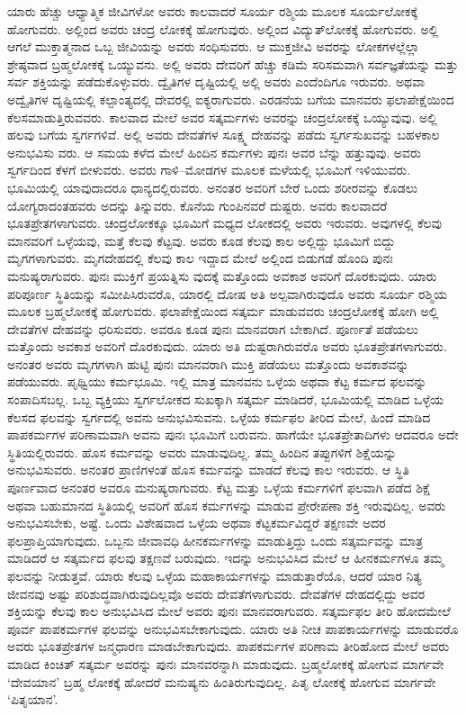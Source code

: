 ಯಾರು ಹೆಚ್ಚು ಆಧ್ಯಾತ್ಮಿಕ ಜೀವಿಗಳೋ ಅವರು ಕಾಲವಾದರೆ ಸೂರ್ಯ ರಶ್ಮಿಯ ಮೂಲಕ ಸೂರ್ಯಲೋಕಕ್ಕೆ ಹೋಗುವರು. ಅಲ್ಲಿಂದ ಅವರು ಚಂದ್ರ ಲೋಕಕ್ಕೆ ಹೋಗುವುರು. ಅಲ್ಲಿಂದ ವಿದ್ಯುತ್​ಲೋಕಕ್ಕೆ ಹೋಗುವರು. ಅಲ್ಲಿ ಆಗಲೆ ಮುಕ್ತಾತ್ಮನಾದ ಒಬ್ಬ ಜೀವಿಯನ್ನು ಅವರು ಸಂಧಿಸುವರು. ಆ ಮುಕ್ತಜೀವಿ ಅವರನ್ನು ಲೋಕಗಳಲ್ಲೆಲ್ಲಾ ಶ್ರೇಷ್ಠವಾದ ಬ್ರಹ್ಮಲೋಕಕ್ಕೆ ಒಯ್ಯುವನು. ಅಲ್ಲಿ ಅವರು ದೇವರಿಗೆ ಹೆಚ್ಚು ಕಡಿಮೆ ಸರಿಸಮವಾಗಿ ಸರ್ವಜ್ಞತೆಯನ್ನು ಮತ್ತು ಸರ್ವ ಶಕ್ತಿಯನ್ನು ಪಡೆದುಕೊಳ್ಳುವರು. ದ್ವೈತಿಗಳ ದೃಷ್ಟಿಯಲ್ಲಿ ಅಲ್ಲಿ ಅವರು ಎಂದೆಂದಿಗೂ ಇರುವರು. ಅಥವಾ ಅದ್ವೈತಿಗಳ ದೃಷ್ಟಿಯಲ್ಲಿ ಕಲ್ಪಾಂತ್ಯದಲ್ಲಿ ದೇವರಲ್ಲಿ ಐಕ್ಯರಾಗುವರು. ಎರಡನೆಯ ಬಗೆಯ ಮಾನವರು ಫಲಾಪೇಕ್ಷೆಯಿಂದ ಕೆಲಸಮಾಡುತ್ತಿರುವವರು. ಕಾಲವಾದ ಮೇಲೆ ಅವರ ಸತ್ಕರ್ಮಗಳು ಅವರನ್ನು ಚಂದ್ರಲೋಕಕ್ಕೆ ಒಯ್ಯುವುವು. ಅಲ್ಲಿ ಹಲವು ಬಗೆಯ ಸ್ವರ್ಗಗಳಿವೆ. ಅಲ್ಲಿ ಅವರು ದೇವತೆಗಳ ಸೂಕ್ಷ್ಮ ದೇಹವನ್ನು ಪಡೆದು ಸ್ವರ್ಗಸುಖವನ್ನು ಬಹಳಕಾಲ ಅನುಭವಿಸು ವರು. ಆ ಸಮಯ ಕಳೆದ ಮೇಲೆ ಹಿಂದಿನ ಕರ್ಮಗಳು ಪುನಃ ಅವರ ಬೆನ್ನು ಹತ್ತುವುವು. ಅವರು ಸ್ವರ್ಗದಿಂದ ಕೆಳಗೆ ಬೀಳುವರು. ಅವರು ಗಾಳಿ–ಮೋಡಗಳ ಮೂಲಕ ಮಳೆಯಲ್ಲಿ ಭೂಮಿಗೆ ಇಳಿಯುವರು. ಭೂಮಿಯಲ್ಲಿ ಯಾವುದಾದರೂ ಧಾನ್ಯದಲ್ಲಿರುವರು. ಅನಂತರ ಅವರಿಗೆ ಬೇರೆ ಒಂದು ಶರೀರವನ್ನು ಕೊಡಲು ಯೋಗ್ಯರಾದಂತಹವರು ಅದನ್ನು ತಿನ್ನುವರು. ಕೊನೆಯ ಗುಂಪಿನವರೆ ದುಷ್ಟರು. ಅವರು ಕಾಲವಾದರೆ ಭೂತಪ್ರೇತಗಳಾಗುವರು. ಚಂದ್ರಲೋಕಕ್ಕೂ ಭೂಮಿಗೆ ಮಧ್ಯದ ಲೋಕದಲ್ಲಿ ಅವರು ಇರುವರು. ಅವುಗಳಲ್ಲಿ ಕೆಲವು ಮಾನವರಿಗೆ ಒಳ್ಳೆಯವು, ಮತ್ತೆ ಕೆಲವು ಕೆಟ್ಟವು. ಅವರು ಕೂಡ ಕೆಲವು ಕಾಲ ಅಲ್ಲಿದ್ದು ಭೂಮಿಗೆ ಬಿದ್ದು ಮೃಗಗಳಾಗುವರು. ಮೃಗದೇಹದಲ್ಲಿ ಕೆಲವು ಕಾಲ ಇದ್ದಾದ ಮೇಲೆ ಅಲ್ಲಿಂದ ಬಿಡುಗಡೆ ಹೊಂದಿ ಪುನಃ ಮನುಷ್ಯರಾಗುವರು. ಪುನಃ ಮುಕ್ತಿಗೆ ಪ್ರಯತ್ನಿಸು ವುದಕ್ಕೆ ಮತ್ತೊಂದು ಅವಕಾಶ ಅವರಿಗೆ ದೊರಕುವುದು. ಯಾರು ಪರಿಪೂರ್ಣ ಸ್ಥಿತಿಯನ್ನು ಸಮೀಪಿಸಿರುವರೊ, ಯಾರಲ್ಲಿ ದೋಷ ಅತಿ ಅಲ್ಪವಾಗಿರುವುದೊ ಅವರು ಸೂರ್ಯ ರಶ್ಮಿಯ ಮೂಲಕ ಬ್ರಹ್ಮಲೋಕಕ್ಕೆ ಹೋಗುವರು. ಫಲಾಪೇಕ್ಷೆಯಿಂದ ಸತ್ಕರ್ಮ ಮಾಡುವವರು ಚಂದ್ರಲೋಕಕ್ಕೆ ಹೋಗಿ ಅಲ್ಲಿ ದೇವತೆಗಳ ದೇಹವನ್ನು ಧರಿಸುವರು. ಅವರೂ ಕೂಡ ಪುನಃ ಮಾನವರಾಗ ಬೇಕಾಗಿದೆ. ಪೂರ್ಣತೆ ಪಡೆಯಲು ಮತ್ತೊಂದು ಅವಕಾಶ ಅವರಿಗೆ ದೊರಕುವುದು. ಯಾರು ಅತಿ ದುಷ್ಟರಾಗಿರುವರೊ ಅವರು ಭೂತಪ್ರೇತಗಳಾಗುವರು. ಅನಂತರ ಅವರು ಮೃಗಗಳಾಗಿ ಹುಟ್ಟಿ ಪುನಃ ಮಾನವರಾಗಿ ಮುಕ್ತಿ ಪಡೆಯಲು ಮತ್ತೊಂದು ಅವಕಾಶವನ್ನು ಪಡೆಯುವರು. ಪೃಥ್ವಿಯು ಕರ್ಮಭೂಮಿ. ಇಲ್ಲಿ ಮಾತ್ರ ಮಾನವನು ಒಳ್ಳೆಯ ಅಥವಾ ಕೆಟ್ಟ ಕರ್ಮದ ಫಲವನ್ನು ಸಂಪಾದಿಸಬಲ್ಲ. ಒಬ್ಬ ವ್ಯಕ್ತಿಯು ಸ್ವರ್ಗಲೋಕದ ಸುಖಕ್ಕಾಗಿ ಸತ್ಕರ್ಮ ಮಾಡಿದರೆ, ಭೂಮಿಯಲ್ಲಿ ಮಾಡಿದ ಒಳ್ಳೆಯ ಕೆಲಸದ ಫಲವನ್ನು ಸ್ವರ್ಗದಲ್ಲಿ ಅವನು ಅನುಭವಿಸುವನು. ಒಳ್ಳೆಯ ಕರ್ಮಫಲ ತೀರಿದ ಮೇಲೆ, ಹಿಂದೆ ಮಾಡಿದ ಪಾಪಕರ್ಮಗಳ ಪರಿಣಾಮವಾಗಿ ಅವನು ಪುನಃ ಭೂಮಿಗೆ ಬರುವನು. ಹಾಗೆಯೇ ಭೂತಪ್ರೇತಾದಿಗಳು ಆದವರೂ ಅದೇ ಸ್ಥಿತಿಯಲ್ಲಿರುವರು. ಹೊಸ ಕರ್ಮವನ್ನು ಅವರು ಮಾಡುವುದಿಲ್ಲ. ತಮ್ಮ ಹಿಂದಿನ ತಪ್ಪುಗಳಿಗೆ ಶಿಕ್ಷೆಯನ್ನು ಅನುಭವಿಸುವರು. ಅನಂತರ ಪ್ರಾಣಿಗಳಂತೆ ಹೊಸ ಕರ್ಮವನ್ನು ಮಾಡದೆ ಕೆಲವು ಕಾಲ ಇರುವರು. ಆ ಸ್ಥಿತಿ ಪೂರ್ಣವಾದ ಅನಂತರ ಅವರೂ ಮನುಷ್ಯರಾಗುವರು. ಕೆಟ್ಟ ಮತ್ತು ಒಳ್ಳೆಯ ಕರ್ಮಗಳಿಗೆ ಫಲವಾಗಿ ಪಡೆದ ಶಿಕ್ಷೆ ಅಥವಾ ಬಹುಮಾನದ ಸ್ಥಿತಿಯಲ್ಲಿ ಅವರಿಗೆ ಹೊಸ ಕರ್ಮಗಳನ್ನು ಮಾಡುವ ಪ್ರೇರೇಪಣಾ ಶಕ್ತಿ ಇರುವುದಿಲ್ಲ. ಅವರು ಅನುಭವಿಸಬೇಕು, ಅಷ್ಟೆ. ಒಂದು ವಿಶೇಷವಾದ ಒಳ್ಳೆಯ ಅಥವಾ ಕೆಟ್ಟಕರ್ಮವಿದ್ದರೆ ತಕ್ಷಣವೇ ಅದರ ಫಲಪ್ರಾಪ್ತಿಯಾಗುವುದು. ಒಬ್ಬನು ಜೀವಾವಧಿ ಹೀನಕರ್ಮಗಳನ್ನು ಮಾಡುತ್ತಿದ್ದು ಒಂದು ಸತ್ಕರ್ಮವನ್ನು ಮಾತ್ರ ಮಾಡಿದರೆ ಆ ಸತ್ಕರ್ಮದ ಫಲವು ತಕ್ಷಣವೆ ಬರುವುದು. ಇದನ್ನು ಅನುಭವಿಸಿದ ಮೇಲೆ ಆ ಹೀನಕರ್ಮಗಳೂ ತಮ್ಮ ಫಲವನ್ನು ನೀಡುತ್ತವೆ. ಯಾರು ಕೆಲವು ಒಳ್ಳೆಯ ಮಹಾಕಾರ್ಯಗಳನ್ನು ಮಾಡುತ್ತಾರೆಯೊ, ಆದರೆ ಯಾರ ನಿತ್ಯ ಜೀವನವು ಅಷ್ಟು ಪರಿಶುದ್ಧವಾಗಿರುವುದಿಲ್ಲವೊ ಅವರು ದೇವತೆಗಳಾಗುವರು. ದೇವತೆಗಳ ದೇಹದಲ್ಲಿದ್ದು ಅವರ ಶಕ್ತಿಯನ್ನು ಕೆಲವು ಕಾಲ ಅನುಭವಿಸಿದ ಮೇಲೆ ಅವರು ಪುನಃ ಮಾನವರಾಗುವರು. ಸತ್ಕರ್ಮಫಲ ತೀರಿ ಹೋದಮೇಲೆ ಪೂರ್ವ ಪಾಪಕರ್ಮಗಳ ಫಲವನ್ನು ಅನುಭವಿಸಬೇಕಾಗುವುದು. ಯಾರು ಅತಿ ನೀಚ ಪಾಪಕಾರ್ಯಗಳನ್ನು ಮಾಡುವರೊ ಅವರು ಭೂತಪ್ರೇತಗಳ ಜನ್ಮಧಾರಣ ಮಾಡಬೇಕಾಗುವುದು. ಪಾಪಕರ್ಮಗಳ ಪರಿಣಾಮ ತೀರಿಹೋದ ಮೇಲೆ ಅವರು ಮಾಡಿದ ಕಿಂಚಿತ್​ ಸತ್ಕರ್ಮ ಅವರನ್ನು ಪುನಃ ಮಾನವರನ್ನಾಗಿ ಮಾಡುವುದು. ಬ್ರಹ್ಮಲೋಕಕ್ಕೆ ಹೋಗುವ ಮಾರ್ಗವೇ ‘ದೇವಯಾನ’ ಬ್ರಹ್ಮ ಲೋಕಕ್ಕೆ ಹೋದರೆ ಮನುಷ್ಯನು ಹಿಂತಿರುಗುವುದಿಲ್ಲ. ಪಿತೃ ಲೋಕಕ್ಕೆ ಹೋಗುವ ಮಾರ್ಗವೇ ‘ಪಿತೃಯಾನ’.

